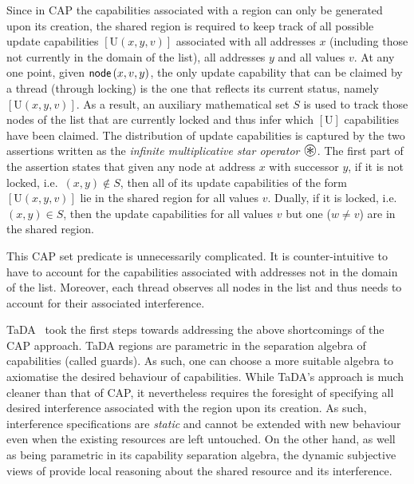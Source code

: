 Since in CAP the capabilities associated with a region can only be generated upon its creation, the shared region is required to keep track of all possible update capabilities $[\text{U}(x, y, v)]$ associated with all addresses $x$ (including those not currently in the domain of the list), all addresses $y$ and all values $v$. At any one point, given $\textsf{node}\left(x, v, y\right)$, the only update capability that can be claimed by a thread (through locking) is the one that reflects its current status, namely $[\text{U}(x, y, v)]$. As a result, an auxiliary mathematical set $S$ is used to track those nodes of the list that are currently locked and thus infer which $[\text{U}]$ capabilities have been claimed. The distribution of update capabilities is captured by the two assertions written as the \emph{infinite multiplicative star operator} $\iterStar$. The first part of the assertion states that given any node at address $x$ with successor $y$, if it is not locked, i.e.\ $(x, y) \not\in S$, then {all} of its update capabilities of the form $[\text{U}(x, y, v)]$ lie in the shared region for {all} values $v$. Dually, if it is locked, i.e.\ $(x, y) \in S$, then the update capabilities for {all} values $v$ {but one} ($w \not= v$) are in the shared region.

This CAP set predicate is unnecessarily complicated. It is counter-intuitive
to have to  account for the capabilities associated with   addresses not in the domain of the list. Moreover, each thread observes all nodes in the list and thus needs to account for their associated interference. 

TaDA~\cite{tada} took the first steps towards addressing the above
shortcomings of the CAP approach. TaDA regions are parametric in the
separation algebra of capabilities (called guards).
As such, one can choose a
more suitable algebra to axiomatise the desired behaviour of capabilities. 
While TaDA's approach is much cleaner than that of CAP, it nevertheless requires the foresight of specifying all desired interference associated with the region upon its creation. 
As such, interference specifications are \emph{static} and cannot be extended with new behaviour even when the existing resources are left untouched. 
On the other hand, as well as being parametric in its capability
separation algebra, the dynamic subjective views of \colosl provide
local reasoning about  the shared resource and its interference. 
%

